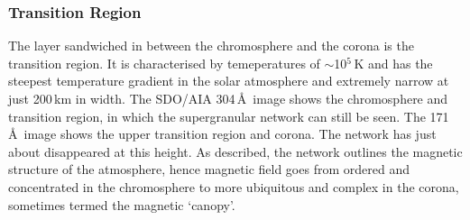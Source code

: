 \subsubsection{Transition Region}
The layer sandwiched in between the chromosphere and the corona is the transition region. It is characterised by temeperatures of $\sim$10$^{5}$\,K and has the steepest temperature gradient in the solar atmosphere and extremely narrow at just 200\,km in width. The SDO/AIA 304\,\AA~image shows the chromosphere and transition region, in which the supergranular network can still be seen. The 171\,\AA~image shows the upper transition region and corona. The network has just about disappeared at this height. As described, the network outlines the magnetic structure of the atmosphere, hence magnetic field goes from ordered and concentrated in the chromosphere to more ubiquitous and complex in the corona, sometimes termed the magnetic `canopy'.






